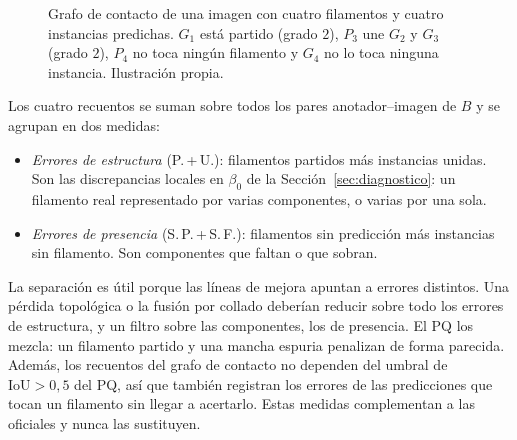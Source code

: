 \begin{figure}[ht]
\centering
{}
\caption{Grafo de contacto de una imagen con cuatro filamentos y cuatro
instancias predichas. $G_1$ está partido (grado $2$), $P_3$ une $G_2$ y
$G_3$ (grado $2$), $P_4$ no toca ningún filamento y $G_4$ no lo toca
ninguna instancia. Ilustración propia.}
\label{fig:contacto}
\end{figure}

Los cuatro recuentos se suman sobre todos los pares anotador--imagen de
$B$ y se agrupan en dos medidas:
\begin{itemize}
  \item \emph{Errores de estructura} (P.\,+\,U.): filamentos partidos más
  instancias unidas. Son las discrepancias locales en $\beta_0$ de la
  Sección~\ref{sec:diagnostico}: un filamento real representado por
  varias componentes, o varias por una sola.
  \item \emph{Errores de presencia} (S.\,P.\,+\,S.\,F.): filamentos sin
  predicción más instancias sin filamento. Son componentes que faltan o
  que sobran.
\end{itemize}
La separación es útil porque las líneas de mejora apuntan a errores
distintos. Una pérdida topológica o la fusión por collado deberían
reducir sobre todo los errores de estructura, y un filtro sobre las
componentes, los de presencia. El PQ los mezcla: un filamento partido y
una mancha espuria penalizan de forma parecida. Además, los recuentos
del grafo de contacto no dependen del umbral de $\mathrm{IoU}>0{,}5$ del
PQ, así que también registran los errores de las predicciones que tocan
un filamento sin llegar a acertarlo. Estas medidas complementan a las
oficiales y nunca las sustituyen.

